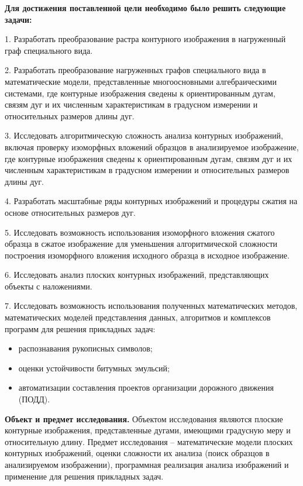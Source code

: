 \textbf{Для достижения поставленной цели необходимо было решить следующие задачи:}	

1. Разработать преобразование растра контурного изображения в нагруженный граф специального вида.

2. Разработать преобразование нагруженных графов специального вида в математические модели, представленные многоосновными алгебраическими системами, где контурные изображения сведены к ориентированным дугам, связям дуг и их численным характеристикам в градусном измерении и  относительных размеров  длины дуг.

3. Исследовать алгоритмическую сложность  анализа контурных изображений, включая проверку изоморфных вложений образцов в анализируемое изображение, где контурные изображения сведены к ориентированным дугам, связям дуг и их численным характеристикам в градусном измерении и  относительных размеров  длины дуг.

4. Разработать  масштабные ряды контурных изображений и процедуры сжатия на  основе относительных размеров дуг.

5. Исследовать возможность использования  изоморфного вложения сжатого образца в сжатое изображение для уменьшения алгоритмической сложности построения  изоморфного вложения исходного образца в исходное изображение.

6. Исследовать анализ плоских контурных изображений, представляющих объекты с наложениями.

7. Исследовать возможность использования полученных математических методов, математических моделей представления данных, алгоритмов и комплексов программ для решения прикладных задач:

\begin{itemize}
   \item распознавания рукописных символов;
   \item  оценки устойчивости битумных эмульсий;
   \item  автоматизации составления проектов организации дорожного движения (ПОДД). 
\end{itemize}

\textbf{Объект и предмет исследования.}  Объектом исследования являются плоские контурные изображения, представленные дугами, имеющими градусную меру и относительную длину. Предмет исследования – математические модели плоских контурных изображений, оценки сложности их анализа (поиск образцов в анализируемом изображении), программная реализация анализа изображений и применение для решения прикладных задач. 
	
